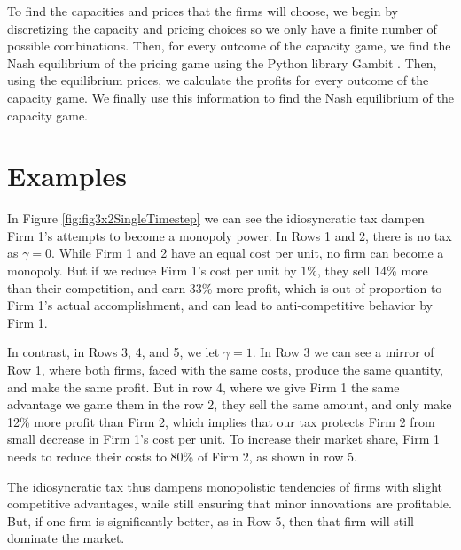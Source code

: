 \documentclass[11pt]{article}
\begin{document}
To find the capacities and prices that the firms will choose, we begin by
discretizing the capacity and pricing choices so we only have a finite number
of possible combinations. Then, for every outcome of the capacity game, we find
the Nash equilibrium of the pricing game using the Python library Gambit
\cite{gambitPython}. Then, using the equilibrium prices, we calculate the
profits for every outcome of the capacity game. We finally use this information
to find the Nash equilibrium of the capacity game.

\section{Examples}
In Figure \ref{fig:fig3x2SingleTimestep} we can see the idiosyncratic tax
dampen Firm 1's attempts to become a monopoly power. In Rows 1 and 2, there is
no tax as $\gamma = 0$. While Firm 1 and 2 have an equal cost per unit, no firm
can become a monopoly. But if we reduce Firm 1's cost per unit by $1\%$, they
sell 14\% more than their competition, and earn 33\% more profit, which is out
of proportion to Firm 1's actual accomplishment, and can lead to
anti-competitive behavior by Firm 1.

In contrast, in Rows 3, 4, and 5, we let $\gamma = 1$. In Row 3 we can see a
mirror of Row 1, where both firms, faced with the same costs, produce the same
quantity, and make the same profit. But in row 4, where we give Firm 1 the same
advantage we game them in the row 2, they sell the same amount, and only make
12\% more profit than Firm 2, which implies that our tax protects Firm 2 from
small decrease in Firm 1's cost per unit. To increase their market share, Firm
1 needs to reduce their costs to 80\% of Firm 2, as shown in row 5.

The idiosyncratic tax thus dampens monopolistic tendencies of firms with slight
competitive advantages, while still ensuring that minor innovations are
profitable. But, if one firm is significantly better, as in Row 5, then that
firm will still dominate the market.
\end{document}
